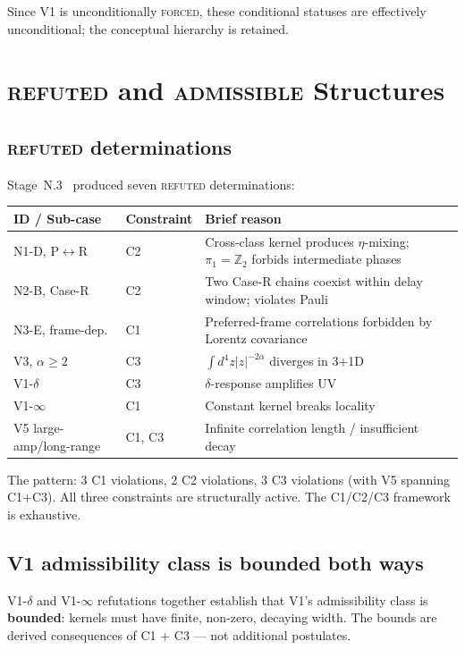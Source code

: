 \documentclass[11pt,a4paper]{article}
\begin{document}
Since V1 is unconditionally \textsc{forced}, these conditional statuses are effectively unconditional; the conceptual hierarchy is retained.

\section{\textsc{refuted} and \textsc{admissible} Structures}

\subsection{\textsc{refuted} determinations}

Stage~N.3~\cite{n3} produced seven \textsc{refuted} determinations:
\begin{center}
\begin{tabular}{lll}
\hline
ID / Sub-case & Constraint & Brief reason \\
\hline
N1-D, P$\leftrightarrow$R & C2 & Cross-class kernel produces $\eta$-mixing; $\pi_1 = \mathbb{Z}_2$ forbids intermediate phases \\
N2-B, Case-R & C2 & Two Case-R chains coexist within delay window; violates Pauli \\
N3-E, frame-dep. & C1 & Preferred-frame correlations forbidden by Lorentz covariance \\
V3, $\alpha \geq 2$ & C3 & $\int d^4z |z|^{-2\alpha}$ diverges in 3+1D \\
V1-$\delta$ & C3 & $\delta$-response amplifies UV \\
V1-$\infty$ & C1 & Constant kernel breaks locality \\
V5 large-amp/long-range & C1, C3 & Infinite correlation length / insufficient decay \\
\hline
\end{tabular}
\end{center}

The pattern: 3 C1 violations, 2 C2 violations, 3 C3 violations (with V5 spanning C1+C3). All three constraints are structurally active. The C1/C2/C3 framework is exhaustive.

\subsection{V1 admissibility class is bounded both ways}

V1-$\delta$ and V1-$\infty$ refutations together establish that V1's admissibility class is \textbf{bounded}: kernels must have finite, non-zero, decaying width. The bounds are derived consequences of C1 + C3 --- not additional postulates.
\end{document}
